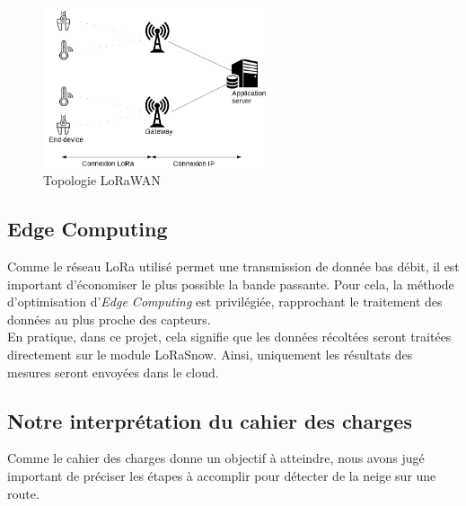 \begin{figure}[H]
    \centering
    \includegraphics[width=0.6\textwidth]{Images/Illustration/Architecture_lorawan.png}
    \caption[]{Topologie LoRaWAN\footnotemark[1]}
    \label{LoRaWANTopo}
\end{figure}


\subsection{Edge Computing}

Comme le réseau LoRa utilisé permet une transmission de donnée bas débit, il est important d'économiser
le plus possible la bande passante. Pour cela, la méthode d'optimisation d'\emph{Edge Computing} est
privilégiée, rapprochant le traitement des données au plus proche des capteurs.\\
En pratique, dans ce projet, cela signifie que les données récoltées seront traitées directement sur 
le module LoRaSnow. Ainsi, uniquement les résultats des mesures seront envoyées dans le cloud.

\subsection{Notre interprétation du cahier des charges}
Comme le cahier des charges donne un objectif à atteindre, nous avons jugé important de préciser les 
étapes à accomplir pour détecter de la neige sur une route.

